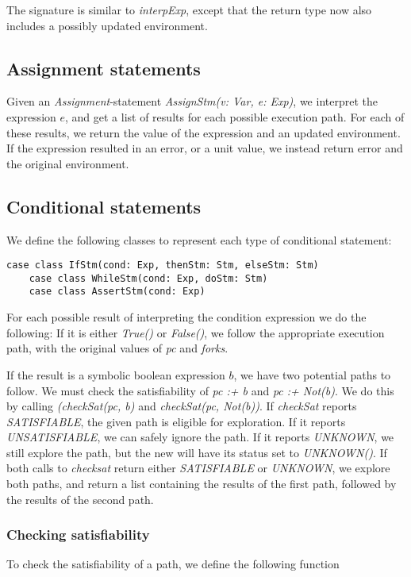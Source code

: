 The signature is similar to \textsl{interpExp}, except that the return type now also includes a possibly updated environment. 

\subsection{Assignment statements}
Given an \textsl{Assignment}-statement \textsl{AssignStm(v: Var, e: Exp)}, we interpret the expression $e$, and get a list of results for each possible execution path. For each of these results, we return the value of the expression and an updated environment. If the expression resulted in an error, or a unit value, we instead return error and the original environment. 

\subsection{Conditional statements}

We define the following classes to represent each type of conditional statement:

\begin{lstlisting}[style=simple]
	case class IfStm(cond: Exp, thenStm: Stm, elseStm: Stm)
	case class WhileStm(cond: Exp, doStm: Stm)
	case class AssertStm(cond: Exp)
\end{lstlisting}
For each possible result of interpreting the condition expression we do the following: If it is either \textsl{True()} or \textsl{False()}, we follow the appropriate execution path, with the original values of \textsl{pc} and \textsl{forks}. 

\noindent If the result is a symbolic boolean expression $b$, we have two potential paths to follow. We must check the satisfiability of \textsl{pc :+ b} and \textsl{pc :+ Not(b)}. We do this by calling \textsl{(checkSat(pc, b)} and \textsl{checkSat(pc, Not(b))}. If \textsl{checkSat} reports \textsl{SATISFIABLE}, the given path is eligible for exploration. If it reports \textsl{UNSATISFIABLE}, we can safely ignore the path. If it reports \textsl{UNKNOWN}, we still explore the path, but the new \pc will have its status set to \textsl{UNKNOWN()}.
 If both calls to \textsl{checksat} return either \textsl{SATISFIABLE} or \textsl{UNKNOWN}, we explore both paths, and return a list containing the results of the first path, followed by the results of the second path.

\subsubsection{Checking satisfiability}
To check the satisfiability of a path, we define the following function

